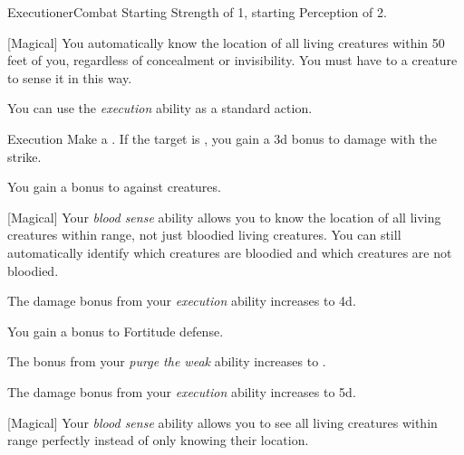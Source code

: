     \begin{feat}{Executioner}{Combat}
        \featpres Starting Strength of 1, starting Perception of 2.

        [Magical] You automatically know the location of all  living creatures within 50 feet of you, regardless of concealment or invisibility.
        You must have  to a creature to sense it in this way.

         You can use the \textit{execution} ability as a standard action.
        \begin{apability}{Execution}
            Make a .
            If the target is , you gain a \plus3d bonus to damage with the strike.
        \end{apability}

         You gain a  bonus to  against  creatures.

        [Magical] Your \textit{blood sense} ability allows you to know the location of all living creatures within range, not just bloodied living creatures.
        You can still automatically identify which creatures are bloodied and which creatures are not bloodied.

         The damage bonus from your \textit{execution} ability increases to \plus4d.

         You gain a  bonus to Fortitude defense.

         The bonus from your \textit{purge the weak} ability increases to .

         The damage bonus from your \textit{execution} ability increases to \plus5d.

        [Magical] Your \textit{blood sense} ability allows you to see all living creatures within range perfectly instead of only knowing their location.
    \end{feat}

